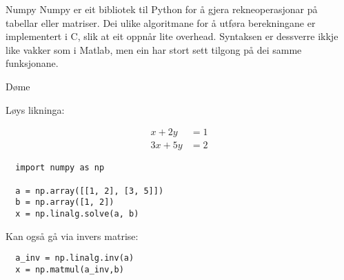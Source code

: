 \begin{frame}[containsverbatim]{Numpy}
  Numpy er eit bibliotek til Python for å gjera rekneoperasjonar på tabellar eller matriser. Dei ulike algoritmane for å utføra berekningane er implementert i C, slik at eit oppnår lite overhead. Syntaksen er dessverre ikkje like vakker som i Matlab, men ein har stort sett tilgong på dei samme funksjonane.

\end{frame}

\begin{frame}[containsverbatim]{Døme}
  
  Løys likninga:
  
  \begin{align}
    x + 2y &= 1 \\
    3x  + 5y &= 2
  \end{align}
  
\begin{verbatim}
  import numpy as np

  a = np.array([[1, 2], [3, 5]])
  b = np.array([1, 2])
  x = np.linalg.solve(a, b)
\end{verbatim}

Kan også gå via invers matrise:

\begin{verbatim}
  a_inv = np.linalg.inv(a)
  x = np.matmul(a_inv,b)
\end{verbatim}

\end{frame}
